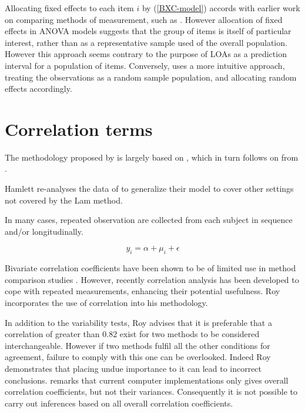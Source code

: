 \documentclass[12pt, a4paper]{report}
\theoremstyle{plain}
\theoremstyle{definition}
\theoremstyle{remark}
\begin{document}
Allocating fixed effects to each item $i$ by (\ref{BXC-model}) accords with earlier work on comparing methods of measurement, such as \citet{Grubbs48}. However allocation of fixed effects in ANOVA models suggests that the group of items is itself of particular interest, rather than as a representative sample used of the overall population. However this approach seems contrary to the purpose of LOAs as a prediction interval for a population of items. Conversely, \citet{roy}
uses a more intuitive approach, treating the observations as a random sample population, and allocating random effects accordingly.






\section{Correlation terms}
The methodology proposed by \citet{ARoy2009} is largely based on \citet{hamlett}, which in turn follows on from \citet{lam}.



Hamlett re-analyses the data of \citet{lam} to generalize their model to cover other settings not covered by the Lam method.

In many cases, repeated observation are collected from each subject in sequence  and/or longitudinally.


\[ y_i = \alpha + \mu_i + \epsilon \]


Bivariate correlation coefficients have been shown to be of
limited use in method comparison studies \citep{BA86}. However,
recently correlation analysis has been developed to cope with
repeated measurements, enhancing their potential usefulness. Roy
incorporates the use of correlation into his methodology.


In addition to the variability tests, Roy advises that it is preferable that a correlation of greater than $0.82$ exist for two methods to be considered interchangeable. However if two methods fulfil all the other conditions for agreement, failure to comply with this one can be overlooked. Indeed Roy demonstrates that placing undue importance to it can lead to incorrect conclusions. \citet{ARoy2009} remarks that current computer implementations only gives overall correlation coefficients, but not their variances. Consequently it is not possible to carry out inferences based on all overall correlation coefficients.
\end{document}
